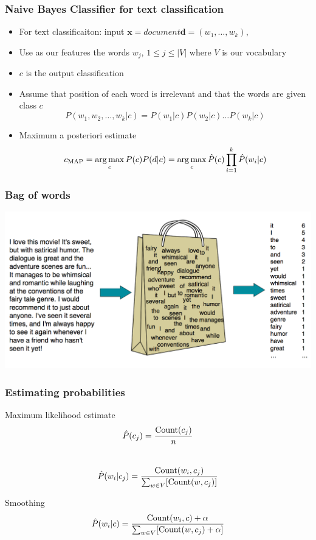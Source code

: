 \begin{frame}
\frametitle{Naive Bayes Classifier for text classification}
\begin{itemize}[<+->]
\item For text classificaiton: input $\textbf{x} = document \textbf{d} = (w_1, \ldots, w_k)$, 
\item Use as our features the words $w_j$, $1 \leq j \leq |V|$ where $V$ is our vocabulary 
\item $c$ is the output classification
\item Assume that position of each word is irrelevant and that the words are  given class $c$
\begin{equation*}
P(w_1, w_2, \ldots, w_k | c) = P(w_1|c) P(w_2|c) \ldots P(w_k|c) 
\end{equation*} 
\item Maximum a posteriori estimate
\begin{equation*}
c_{\text{MAP}} = \operatorname*{arg\,max}_{c} P(c) P(d|c)  = \operatorname*{arg\,max}_{c} \hat{P}(c) \prod_{i=1}^{k} \hat{P}(w_i | c)
\end{equation*}
\end{itemize}
\end{frame}

\begin{frame}
\frametitle{Bag of words}
\includegraphics[scale=0.25]{figures/classifiers/bow.png}
\end{frame}

\begin{frame}
\frametitle{Estimating probabilities}
\begin{block}{Maximum likelihood estimate}
\begin{equation*}\hat{P}(c_j) = \frac{\operatorname{Count}(c_j)}{n}\end{equation*} \\
\pause
\begin{equation*}\hat{P}(w_i | c_j) = \frac{\operatorname{Count}(w_i, c_j)}{\sum_{w \in V}[\operatorname{Count}(w, c_j)]}\end{equation*}
\end{block}
\pause
\begin{block}{Smoothing}
\begin{equation*}\hat{P}(w_i | c) = \frac{\operatorname{Count}(w_i, c) + \alpha}{\sum_{w \in V}[\operatorname{Count}(w, c_j) + \alpha ]}\end{equation*}
\end{block}
\end{frame}


